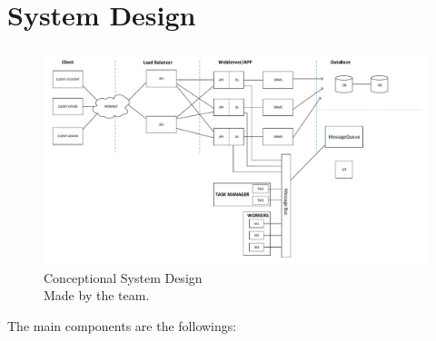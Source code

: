 \section{System Design}


\begin{figure}[!htbp]
	\includegraphics[width=0.95\textheight, angle=90]{figures/atfogo_rendszerterv_teljes.pdf}
	\caption[Conceptional System Design]{Conceptional System Design\\Made by the team.}
	\label{fig:conceptional-system-design}
\end{figure}



The main components are the followings:

